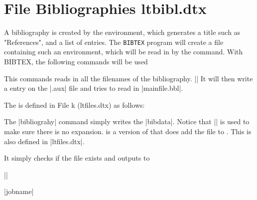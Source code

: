\section{File  Bibliographies ltbibl.dtx} %

A bibliography is created by the  environment, which generates
a title such as "References", and a list of entries. The \texttt{BIBTEX} program will create
a file containing such an environment, which will be read in by the 
command. With BIBTEX, the following commands will be used


 This commands reads in all the filenames of the bibliography. ||
It will then write a  entry on the |.aux| file and tries to read in |mainfile.bbl|.



The  is defined in File k (ltfiles.dtx) as follows:
\begin{teX}
\newif\if@filesw \@fileswtrue
\end{teX}

The |bibliograhy| command simply writes the |bibdata|. Notice that |\string| is used to make sure  there is no expansion.  is a version of  that does add the file to . This is also defined in |ltfiles.dtx|. 

\begin{teX}
\def\@input@#1{\InputIfFileExists{#1}{}{\typeout{No file #1.}}}
\end{teX}


\noindent It simply checks if the file exists and outputs to 




\makeatletter

|\if@filesw|~~~   \if@filesw

|jobname|          \jobname



